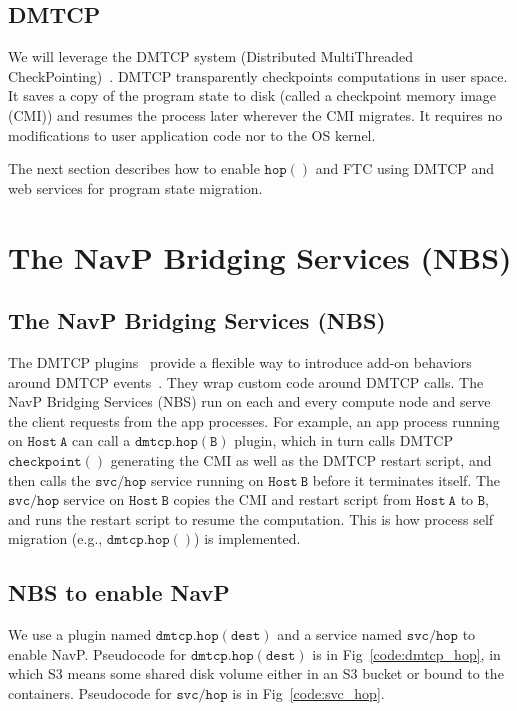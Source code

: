 \documentclass[conference]{IEEEtran}
\begin{document}
\subsection{DMTCP}
\label{subsec:s13}

We will leverage the DMTCP system (Distributed MultiThreaded CheckPointing)~\cite{ansel2009dmtcp}. DMTCP transparently checkpoints computations in user space. It saves a copy of the program state to disk (called a checkpoint memory image (CMI)) and resumes the process later wherever the CMI migrates. It requires no modifications to user application code nor to the OS kernel.

The next section describes how to enable $\mathtt{hop()}$ and FTC using DMTCP and web services for program state migration.


\section{The NavP Bridging Services (NBS) }
\label{sec:s2}

\subsection{The NavP Bridging Services (NBS)}
\label{subsec:s21}

The DMTCP plugins~\cite{dmtcp-openproc-2013} provide a flexible way to introduce add-on behaviors around DMTCP events~\cite{ansel2009dmtcp}. They wrap custom code around DMTCP calls. The NavP Bridging Services (NBS) run on each and every compute node and serve the client requests from the app processes. For example, an app process running on $\mathtt{Host~A}$ can call a $\mathtt{dmtcp.hop(B)}$ plugin, which in turn calls DMTCP $\mathtt{checkpoint()}$ generating the CMI as well as the DMTCP restart script, and then calls the $\mathtt{svc/hop}$ service running on $\mathtt{Host~B}$ before it terminates itself. The $\mathtt{svc/hop}$ service on $\mathtt{Host~B}$ copies the CMI and restart script from $\mathtt{Host~A}$ to $\mathtt{B}$, and runs the restart script to resume the computation. This is how process self migration (e.g., $\mathtt{dmtcp.hop()}$) is implemented.

\subsection{NBS to enable NavP}
\label{subsec:s22}

We use a plugin named $\mathtt{dmtcp.hop(dest)}$ and a service named $\mathtt{svc/hop}$ to enable NavP. 
Pseudocode for $\mathtt{dmtcp.hop(dest)}$ is in Fig~\ref{code:dmtcp_hop}, in which S3 means some shared disk volume either 
in an S3 bucket or bound to the containers. Pseudocode for $\mathtt{svc/hop}$ is in Fig~\ref{code:svc_hop}.
\end{document}
